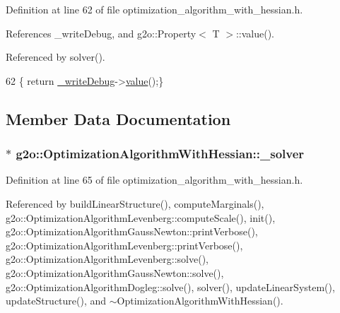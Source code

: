 Definition at line 62 of file optimization\+\_\+algorithm\+\_\+with\+\_\+hessian.\+h.



References \+\_\+write\+Debug, and g2o\+::\+Property$<$ T $>$\+::value().



Referenced by solver().


\begin{DoxyCode}
62 \{ \textcolor{keywordflow}{return} \hyperlink{classg2o_1_1OptimizationAlgorithmWithHessian_a6dd1e4e8dc2d09233c40de02b2c9fe8c}{\_writeDebug}->\hyperlink{classg2o_1_1Property_aefa3e7a5fcb2c8e061ecb07485f1371c}{value}();\}
\end{DoxyCode}


\subsection{Member Data Documentation}
\subsubsection[{\texorpdfstring{\+\_\+solver}{_solver}}]{$\ast$ g2o\+::\+Optimization\+Algorithm\+With\+Hessian\+::\+\_\+solver\hspace{0.3cm}{\ttfamily [protected]}}\hypertarget{classg2o_1_1OptimizationAlgorithmWithHessian_a88a2d1dccee8f7481ece407f2681a151}{}\label{classg2o_1_1OptimizationAlgorithmWithHessian_a88a2d1dccee8f7481ece407f2681a151}


Definition at line 65 of file optimization\+\_\+algorithm\+\_\+with\+\_\+hessian.\+h.



Referenced by build\+Linear\+Structure(), compute\+Marginals(), g2o\+::\+Optimization\+Algorithm\+Levenberg\+::compute\+Scale(), init(), g2o\+::\+Optimization\+Algorithm\+Gauss\+Newton\+::print\+Verbose(), g2o\+::\+Optimization\+Algorithm\+Levenberg\+::print\+Verbose(), g2o\+::\+Optimization\+Algorithm\+Levenberg\+::solve(), g2o\+::\+Optimization\+Algorithm\+Gauss\+Newton\+::solve(), g2o\+::\+Optimization\+Algorithm\+Dogleg\+::solve(), solver(), update\+Linear\+System(), update\+Structure(), and $\sim$\+Optimization\+Algorithm\+With\+Hessian().

